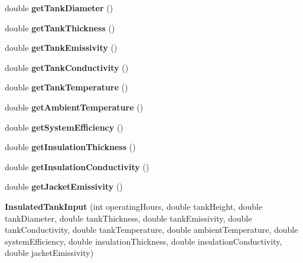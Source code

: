 \begin{DoxyCompactItemize}
double {\bfseries get\+Tank\+Diameter} ()
\item 
\mbox{\label{class_insulated_tank_input_a90736683268c81eca197e40f5aa06546}} 
double {\bfseries get\+Tank\+Thickness} ()
\item 
\mbox{\label{class_insulated_tank_input_abb25db5115d46d28272482695630adf2}} 
double {\bfseries get\+Tank\+Emissivity} ()
\item 
\mbox{\label{class_insulated_tank_input_a6cc01289839f3aecf9887417bf9bf263}} 
double {\bfseries get\+Tank\+Conductivity} ()
\item 
\mbox{\label{class_insulated_tank_input_a79db35933549eefef6daa5ee9d9e6711}} 
double {\bfseries get\+Tank\+Temperature} ()
\item 
\mbox{\label{class_insulated_tank_input_ad132de18e6b3fa396d449bb2c37dd527}} 
double {\bfseries get\+Ambient\+Temperature} ()
\item 
\mbox{\label{class_insulated_tank_input_a5d072c8368862146fa4b1e96e9e656ef}} 
double {\bfseries get\+System\+Efficiency} ()
\item 
\mbox{\label{class_insulated_tank_input_a0390113c09b7a97d07ced6169fe7b7be}} 
double {\bfseries get\+Insulation\+Thickness} ()
\item 
\mbox{\label{class_insulated_tank_input_a53602b88819bff3e860d1fe3e1181995}} 
double {\bfseries get\+Insulation\+Conductivity} ()
\item 
\mbox{\label{class_insulated_tank_input_af3467e96bcf20c41f2d5fb02ad88aff9}} 
double {\bfseries get\+Jacket\+Emissivity} ()
\item 
\mbox{\label{class_insulated_tank_input_a0c907f9c88a2cc9151857fb42405df14}} 
{\bfseries Insulated\+Tank\+Input} (int operating\+Hours, double tank\+Height, double tank\+Diameter, double tank\+Thickness, double tank\+Emissivity, double tank\+Conductivity, double tank\+Temperature, double ambient\+Temperature, double system\+Efficiency, double insulation\+Thickness, double insulation\+Conductivity, double jacket\+Emissivity)

\end{DoxyCompactItemize}
